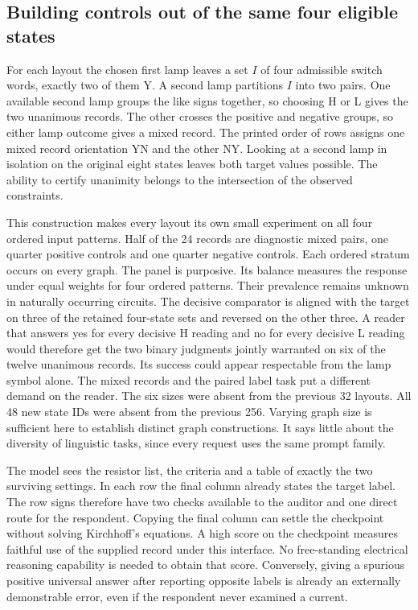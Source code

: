 \documentclass[12pt,letterpaper]{article}
\begin{document}
\subsection{Building controls out of the same four eligible states}
For each layout the chosen first lamp leaves a set $I$ of four admissible switch words, exactly two of them Y. A second lamp partitions $I$ into two pairs. One available second lamp groups the like signs together, so choosing H or L gives the two unanimous records. The other crosses the positive and negative groups, so either lamp outcome gives a mixed record. The printed order of rows assigns one mixed record orientation YN and the other NY. Looking at a second lamp in isolation on the original eight states leaves both target values possible. The ability to certify unanimity belongs to the intersection of the observed constraints.

This construction makes every layout its own small experiment on all four ordered input patterns. Half of the 24 records are diagnostic mixed pairs, one quarter positive controls and one quarter negative controls. Each ordered stratum occurs on every graph. The panel is purposive. Its balance measures the response under equal weights for four ordered patterns. Their prevalence remains unknown in naturally occurring circuits. The decisive comparator is aligned with the target on three of the retained four-state sets and reversed on the other three. A reader that answers yes for every decisive H reading and no for every decisive L reading would therefore get the two binary judgments jointly warranted on six of the twelve unanimous records. Its success could appear respectable from the lamp symbol alone. The mixed records and the paired label task put a different demand on the reader. The six sizes were absent from the previous 32 layouts. All 48 new state IDs were absent from the previous 256. Varying graph size is sufficient here to establish distinct graph constructions. It says little about the diversity of linguistic tasks, since every request uses the same prompt family.

The model sees the resistor list, the criteria and a table of exactly the two surviving settings. In each row the final column already states the target label. The row signs therefore have two checks available to the auditor and one direct route for the respondent. Copying the final column can settle the checkpoint without solving Kirchhoff’s equations. A high score on the checkpoint measures faithful use of the supplied record under this interface. No free-standing electrical reasoning capability is needed to obtain that score. Conversely, giving a spurious positive universal answer after reporting opposite labels is already an externally demonstrable error, even if the respondent never examined a current.
\end{document}

